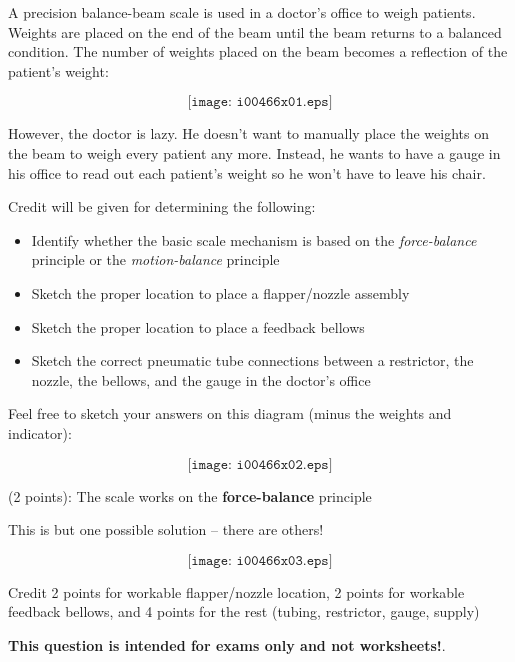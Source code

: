 

A precision balance-beam scale is used in a doctor's office to weigh patients.  Weights are placed on the end of the beam until the beam returns to a balanced condition.  The number of weights placed on the beam becomes a reflection of the patient's weight:

$$\texttt{[image: i00466x01.eps]}$$

However, the doctor is lazy.  He doesn't want to manually place the weights on the beam to weigh every patient any more.  Instead, he wants to have a gauge in his office to read out each patient's weight so he won't have to leave his chair.

\vskip 10pt

\noindent
Credit will be given for determining the following:

\begin{itemize}
\item{} Identify whether the basic scale mechanism is based on the {\it force-balance} principle or the {\it motion-balance} principle
\item{} Sketch the proper location to place a flapper/nozzle assembly
\item{} Sketch the proper location to place a feedback bellows
\item{} Sketch the correct pneumatic tube connections between a restrictor, the nozzle, the bellows, and the gauge in the doctor's office
\end{itemize}

Feel free to sketch your answers on this diagram (minus the weights and indicator):

\vskip 40pt

$$\texttt{[image: i00466x02.eps]}$$







(2 points): The scale works on the {\bf force-balance} principle

\vskip 10pt

This is but one possible solution -- there are others!

$$\texttt{[image: i00466x03.eps]}$$

Credit 2 points for workable flapper/nozzle location, 2 points for workable feedback bellows, and 4 points for the rest (tubing, restrictor, gauge, supply)







{\bf This question is intended for exams only and not worksheets!}.



